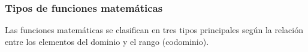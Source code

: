 \documentclass[11pt, twocolumn, landscape, a4paper]{article}
\begin{document}

\subsubsection*{Tipos de funciones matemáticas}

\noindent Las funciones matemáticas se clasifican en tres tipos principales según la relación entre los elementos del dominio y el rango (codominio).
\end{document}
